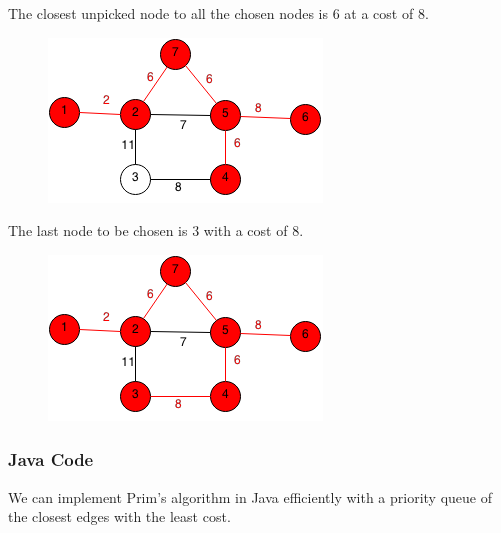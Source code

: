 \documentclass[11pt,oneside]{book}
\makeatletter
\def\maxwidth#1{\ifdim\Gin@nat@width>#1 #1\else\Gin@nat@width\fi}
\makeatother
\begin{document}
The closest unpicked node to all the chosen nodes is 6 at a cost of 8.
\vspace{5px}\begin{figure}[H]\centering
        \includegraphics[width=0.66\maxwidth{\textwidth}]{prim6.png}
        \end{figure}

The last node to be chosen is 3 with a cost of 8.

\vspace{5px}\begin{figure}[H]\centering
        \includegraphics[width=0.66\maxwidth{\textwidth}]{prim7.png}
        \end{figure}

\subsubsection{Java Code}

We can implement Prim's algorithm in Java efficiently with a priority queue of the closest edges with the least cost.
\end{document}
